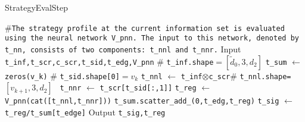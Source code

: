 \documentclass{article}
\newcommand{\py}[1]{\texttt{#1}}
\begin{document}
\begin{algorithm}
\caption{StrategyEvalStep}
\label{alg:your_algorithm}
\begin{algorithmic}[1]
\Statex\textcolor{green!50!black}{\scriptsize \#\py{The strategy profile at the current information set is evaluated using the neural network V\_pnn. The input to this network, denoted by t\_nn, consists of two components: t\_nnl and t\_nnr.}}
\State Input \py{t\_inf,t\_scr,c\_scr,t\_sid,t\_edg,V\_pnn} 
\Statex \textcolor{green!50!black}{\scriptsize \# \py{t\_inf.shape}$=[\tilde{d}_0,3,d_2]$}
\State \py{t\_sum} $\gets$ \py{zeros(v\_k)} \hfill \textcolor{green!50!black}{\scriptsize\# \py{t\_sid.shape[0]$=v_k$}}
\State \py{t\_nnl} $\gets$ \py{t\_inf}$\otimes$\py{c\_scr}\hfill \textcolor{green!50!black}{\scriptsize\# \py{t\_nnl.shape=$[v_{k+1},3,d_2]$ }}
\State \py{t\_nnr} $\gets$ \py{t\_scr[t\_sid[:,1]]}
\State \py{t\_reg} $\gets$ \py{V\_pnn(cat([t\_nnl,t\_nnr]))}
\State \py{t\_sum.scatter\_add\_(0,t\_edg,t\_reg)}
\State \py{t\_sig} $\gets$ \py{t\_reg/t\_sum[t\_edge]}
\State Output \py{t\_sig,t\_reg}
\end{algorithmic}
\end{algorithm}
\end{document}
